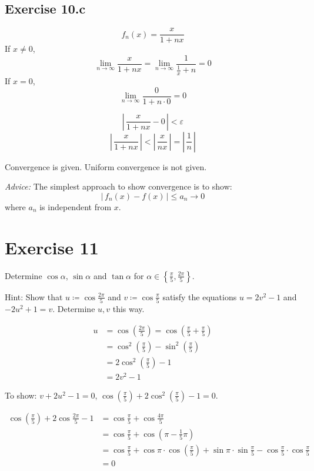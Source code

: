 \documentclass[a4paper]{article}
\theoremstyle{definition}
\newcommand\abs[1]{\left|\,#1\,\right|}
\newcommand\set[1]{\left\{#1\right\}}
\begin{document}
\subsection{Exercise 10.c}
%
\[ f_n(x) = \frac{x}{1 + nx} \]
If $x \neq 0$,
\[ \lim_{n\to\infty} \frac{x}{1 + nx} = \lim_{n\to\infty} \frac{1}{\frac1x + n} = 0 \]
If $x = 0$,
\[ \lim_{n\to\infty} \frac{0}{1 + n \cdot 0} = 0 \]

\[ \abs{\frac{x}{1 + nx} - 0} < \varepsilon \]
\[ \abs{\frac{x}{1 + nx}} < \abs{\frac{x}{nx}} = \abs{\frac{1}{n}} \]

Convergence is given. Uniform convergence is not given.

\emph{Advice:} The simplest approach to show convergence is to show:
\[ \abs{f_n(x) - f(x)} \leq a_n \to 0 \]
where $a_n$ is independent from $x$.

\section{Exercise 11}
\begin{ex}
  Determine $\cos{\alpha}$, $\sin{\alpha}$ and $\tan{\alpha}$ for $\alpha \in \set{\frac{\pi}{5}, \frac{2\pi}{5}}$.

  Hint: Show that $u \coloneqq \cos{\frac{2\pi}{5}}$ and $v \coloneqq \cos{\frac{\pi}{5}}$ satisfy
  the equations $u = 2v^2 - 1$ and $-2u^2 + 1 = v$.
  Determine $u,v$ this way.
\end{ex}

\begin{align*}
  u &= \cos\left(\frac{2\pi}{5}\right) = \cos\left(\frac\pi5 + \frac\pi5\right) \\
    &= \cos^2\left(\frac\pi5\right) - \sin^2\left(\frac\pi5\right) \\
    &= 2 \cos^2\left(\frac\pi5\right) - 1 \\
    &= 2v^2 - 1
\end{align*}

To show: $v + 2u^2 - 1 = 0$, $\cos\left(\frac\pi5\right) + 2\cos^2\left(\frac\pi5\right) - 1 = 0$.

\begin{align*}
  \cos\left(\frac\pi5\right) + 2\cos\frac{2\pi}{5} - 1
    &= \cos{\frac\pi5} + \cos{\frac{4\pi}{5}} \\
    &= \cos{\frac\pi5} + \cos\left(\pi - \frac15 \pi\right) \\
    &= \cos{\frac\pi5} + \cos\pi \cdot \cos\left(\frac{\pi}{5}\right) + \sin\pi \cdot \sin{\frac\pi{5}} - \cos\frac\pi5 \cdot \cos\frac\pi5 \\
    &= 0
\end{align*}
\end{document}
